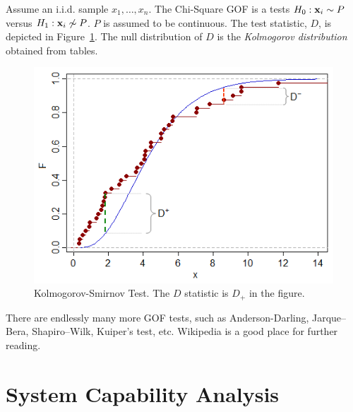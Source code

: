 \documentclass[12pt,a4paper]{report}
\begin{document}
\begin{definition}
Assume an i.i.d. sample $x_1,\dots,x_n$. 
The Chi-Square GOF is a tests $H_0: \mathbf{x}_i \sim P$ versus $H_1: \mathbf{x}_i \not\sim P$.
$P$ is assumed to be continuous.
The test statistic, $D$, is depicted in Figure~\ref{fig:ks_test}.
The null distribution of $D$ is the \emph{Kolmogorov distribution} obtained from tables.

\begin{figure}
\centering
\includegraphics[height=0.3\textheight]{art/Kgn0O}
\caption[Kolmogorov-Smirnov Test]{Kolmogorov-Smirnov Test. The $D$ statistic is $D_+$ in the figure.}
\label{fig:ks_test}
\end{figure}

\end{definition} 






\begin{extra}
There are endlessly many more GOF tests, such as Anderson-Darling, Jarque–Bera, Shapiro–Wilk, Kuiper's test, etc.
Wikipedia is a good place for further reading.
\end{extra}



\chapter{System Capability Analysis}
\label{sec:capability_analysis}

\end{document}
